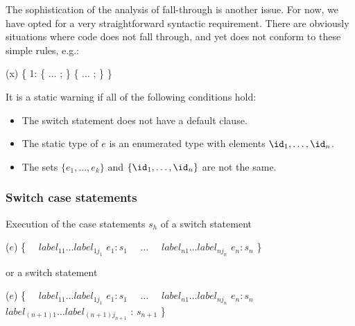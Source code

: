 \documentclass[makeidx]{article}
\begin{document}
{{The sophistication of the analysis of fall-through is another issue.
For now, we have opted for a very straightforward syntactic requirement.
There are obviously situations where code does not fall through, and yet does not conform to these simple rules, e.g.:
}

\begin{dartCode}
\SWITCH{} (x) \{
  \CASE{} 1: \TRY{} \{ $\ldots$ \RETURN{}; \} \FINALLY{} \{ $\ldots$ \RETURN{}; \}
\}
\end{dartCode}


\LMHash{}%
It is a static warning if all of the following conditions hold:
\begin{itemize}
\item The switch statement does not have a default clause.
\item The static type of $e$ is an enumerated type with elements $\id_1, \ldots, \id_n$.
\item The sets $\{e_1, \ldots, e_k\} $ and $\{\id_1, \ldots, \id_n\}$ are not the same.
\end{itemize}



\subsubsection{Switch case statements}

\LMHash{}%
Execution of the case statements $s_h$ of a switch statement

\begin{normativeDartCode}
\SWITCH{} ($e$) \{
\ \ $label_{11} \ldots label_{1j_1}$ \CASE{} $e_1: s_1$
\ \ $\ldots$
\ \ $label_{n1} \ldots label_{nj_n}$ \CASE{} $e_n: s_n$
\}
\end{normativeDartCode}

or a switch statement

\begin{normativeDartCode}
\SWITCH{} ($e$) \{
\ \ $label_{11} \ldots label_{1j_1}$ \CASE{} $e_1: s_1$
\ \ $\ldots$
\ \ $label_{n1} \ldots label_{nj_n}$ \CASE{} $e_n: s_n$
\ \ $label_{(n+1)1} \ldots label_{(n+1)j_{n+1}}$ \DEFAULT{}: $s_{n+1}$
\}
\end{normativeDartCode}

}
\end{document}
